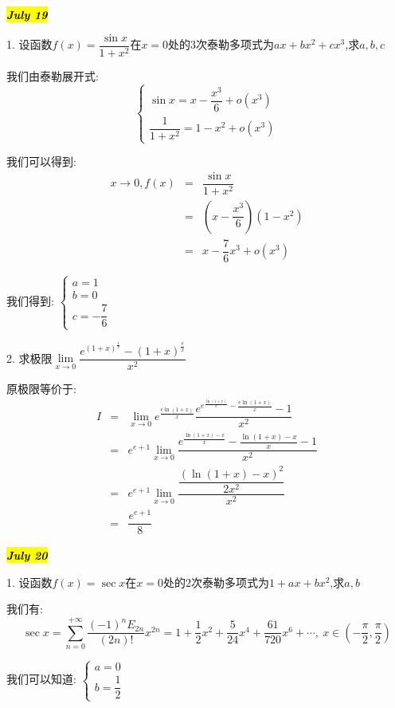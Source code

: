 \hl{\textbf{\textit{July 19}}}

1. 设函数$f(x)=\dfrac{\sin x}{1+x^2}$在$x=0$处的$3$次泰勒多项式为$ax+bx^2+cx^3$,求$a,b,c$
\begin{solution}
	
	我们由泰勒展开式: $$\left\lbrace
	\begin{array}{l}
		\sin x=x-\dfrac{x^3}{6}+o(x^3)\\
		\dfrac{1}{1+x^2}=1-x^2+o(x^3)
	\end{array}
	\right. $$
	
	我们可以得到: 
	\begin{eqnarray*}
		x\rightarrow 0, f(x)&=&\dfrac{\sin x}{1+x^2}\\
		&=&(x-\dfrac{x^3}{6})(1-x^2)\\
		&=&x-\dfrac{7}{6}x^3+o(x^3)
	\end{eqnarray*}
	
	我们得到: $\left\lbrace
	\begin{array}{l}
		a=1\\b=0\\c=-\dfrac{7}{6}
	\end{array}
	\right. $
\end{solution}

2. 求极限$\lim\limits_{x\rightarrow 0}\dfrac{e^{(1+x)^{\frac{1}{x}}}-(1+x)^{\frac{e}{x}}}{x^2}$
\begin{solution}
	
	原极限等价于: 
	\begin{eqnarray*}
		I&=&\lim\limits_{x\rightarrow 0}e^{\frac{e\ln(1+x)}{x}}\dfrac{e^{e^{\frac{\ln(1+x)}{x}}-\frac{e\ln(1+x)}{x}}-1}{x^2}\\
		&=&e^{e+1}\lim\limits_{x\rightarrow 0}\dfrac{e^{\frac{\ln(1+x)-x}{x}}-\frac{\ln(1+x)-x}{x}-1}{x^2}\\
		&=&e^{e+1}\lim\limits_{x\rightarrow 0}\dfrac{\dfrac{(\ln(1+x)-x)^2}{2x^2}}{x^2}\\
		&=&\dfrac{e^{e+1}}{8}
	\end{eqnarray*}
\end{solution}

\hl{\textbf{\textit{July 20}}}

1. 设函数$f(x)=\sec x$在$x=0$处的$2$次泰勒多项式为$1+ax+bx^2$,求$a,b$
\begin{solution}
	
	我们有: $$\sec x=\sum\limits_{n=0}^{+\infty}\dfrac{(-1)^nE_{2n}}{(2n)!}x^{2n}=1+\dfrac{1}{2}x^2+\dfrac{5}{24}x^4+\dfrac{61}{720}x^6+\cdots,\ x\in(-\dfrac{\pi}{2},\dfrac{\pi}{2})$$
	
	我们可以知道: $\left\lbrace
	\begin{array}{l}
		a=0\\b=\dfrac{1}{2}
	\end{array}
	\right. $
\end{solution}


